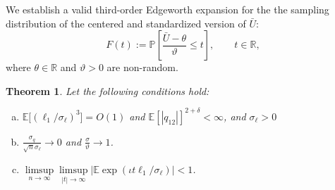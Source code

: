 \documentclass[11pt]{article}
\newtheorem{thm}{Theorem}
\numberwithin{equation}{section}
\theoremstyle{definition}
\renewcommand{\P}{\mathbb{P}}
\newcommand{\E}{\mathbb{E}}
\newcommand{\R}{\mathbb{R}}
\newcommand{\Center}{\theta}
\newcommand{\Scale}{\vartheta}
\begin{document}
We establish a valid third-order Edgeworth expansion for the the sampling distribution of the centered and standardized version of $\bar{U}$:
\begin{equation}
    F(t):=\P\left[\frac{\bar{U}-\Center}{\Scale}\leq t\right],\qquad t\in\R,
\end{equation}
where $\Center\in\R$ and $\Scale>0$ are non-random.

\begin{thm}\label{thm:general} Let the following conditions hold:
    \begin{enumerate}[(a)]
        \item $\E\big[(\ell_1/\sigma_\ell)^3\big]= O(1)$ and $\E[|q_{12}|]^{2+\delta}<\infty$, and $\sigma_\ell>0$ 

        \item $\frac{\sigma_{q}}{\sqrt{n}\sigma_{\ell}} \to 0$ and $\frac{\sigma}{\Scale}\to 1$.

        \item $\limsup\limits_{n\to\infty}\limsup\limits_{|t|\to\infty}|\E \exp(\iota t\ell_1/\sigma_\ell)|<1$.


\end{enumerate}
\end{thm}
\end{document}
